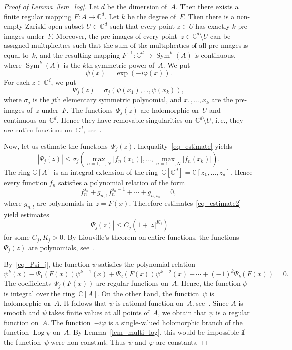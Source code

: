 \documentclass[reqno,tbtags,12pt]{amsart}
\numberwithin{equation}{section}
\newcommand{\C}{\mathbb{C}}
\newcommand{\Log}{\mathop{\mathrm{Log}}\nolimits}
\theoremstyle{definition}
\begin{document}
\begin{proof}[Proof of Lemma~\ref{lem_log}]
Let $d$ be the dimension of~$A$. Then there exists a finite regular mapping $F\colon A\to\C^d$. Let $k$ be the degree of~$F$. Then there is a non-empty Zariski open subset $U\subset \C^d$ such that every point $z\in U$ has exactly $k$ pre-images under~$F$. Moreover, the pre-images of every point~$z\in\C^d\setminus U$ can be assigned multiplicities such that the sum of the multiplicities of all pre-images is equal to~$k$, and the resulting mapping $F^{-1}\colon\C^d\to\mathop{\mathrm{Sym}}^k(A)$ is continuous, where $\mathop{\mathrm{Sym}}^k(A)$ is the $k$th symmetric power of~$A$. We put 
$$
\psi(x)=\exp(-i\varphi(x)).
$$
For each $z\in\C^d$, we put
\begin{equation}\label{eq_Psi_j}
\Psi_j(z)=\sigma_j(\psi(x_1),\ldots,\psi(x_k)),
\end{equation}
where $\sigma_j$ is the $j$th elementary symmetric polynomial, and $x_1,\ldots,x_k$ are the pre-images of~$z$ under~$F$.  The functions~$\Psi_j(z)$ are holomorphic on~$U$ and continuous on~$\C^d$. Hence they have removable singularities on~$\C^d\setminus U$, i.\,e., they are entire functions on~$\C^d$, see~\cite[Sect.~32, Theorem~3]{Sha69}. 



Now, let us estimate the functions~$\Psi_j(z)$.  Inequality~\eqref{eq_estimate} yields 
\begin{equation}\label{eq_estimate2}
|\Psi_j(z)|\le\sigma_j\left(\max_{n=1,\ldots,N} |f_n(x_1)|,\ldots,\max_{n=1,\ldots,N} |f_n(x_k)|\right).
\end{equation}
The ring $\C[A]$ is an integral extension of the ring~$\C[\C^d]=\C[z_1,\ldots,z_d]$. Hence every function $f_n$ satisfies a polynomial relation of the form
$$
f_n^{s_n}+g_{n,1}f_n^{s_n-1}+\cdots+g_{n,s_n}=0,
$$
where $g_{n,l}$ are polynomials in~$z=F(x)$. Therefore estimates~\eqref{eq_estimate2} yield  estimates 
$$
|\Psi_j(z)|\le C_j(1+|z|^{K_j})
$$ 
for some $C_j,K_j>0$.  By Liouville's theorem on entire functions, the functions~$\Psi_j(z)$ are polynomials, see~\cite[Sect.~A1.1]{Chi85}. 

By~\eqref{eq_Psi_j}, the function $\psi$ satisfies the polynomial relation
$$
\psi^k(x)-\Psi_1(F(x))\psi^{k-1}(x)+\Psi_2(F(x))\psi^{k-2}(x)-\cdots+(-1)^k\Psi_k(F(x))=0.
$$
The coefficients~$\Psi_j(F(x))$ are regular functions on~$A$. Hence, the function $\psi$ is integral over the ring~$\C[A]$. On the other hand, the function~$\psi$ is holomorphic on~$A$. It follows that $\psi$ is rational function on~$A$, see~\cite[Ch.~8, Sect.~3.1]{Sha72}. Since $A$ is smooth and $\psi$ takes finite values at all points of~$A$, we obtain that $\psi$ is a regular function on~$A$. The function~$-i\varphi$ is a single-valued holomorphic branch of the function $\Log\psi$ on~$A$. By Lemma~\ref{lem_multi_log}, this would be impossible if the function~$\psi$ were non-constant. Thus $\psi$ and~$\varphi$ are constants.
\end{proof}
\end{document}

